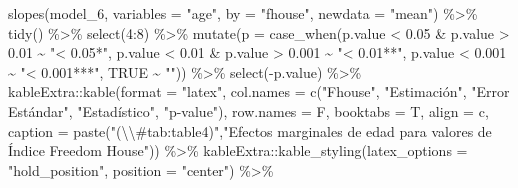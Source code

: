 \documentclass[
  12pt,
  a4paper,
]{article}
\newenvironment{Shaded}{\begin{snugshade}}{\end{snugshade}}
\newcommand{\AttributeTok}[1]{\textcolor[rgb]{0.77,0.63,0.00}{#1}}
\newcommand{\ConstantTok}[1]{\textcolor[rgb]{0.00,0.00,0.00}{#1}}
\newcommand{\DecValTok}[1]{\textcolor[rgb]{0.00,0.00,0.81}{#1}}
\newcommand{\FloatTok}[1]{\textcolor[rgb]{0.00,0.00,0.81}{#1}}
\newcommand{\FunctionTok}[1]{\textcolor[rgb]{0.00,0.00,0.00}{#1}}
\newcommand{\NormalTok}[1]{#1}
\newcommand{\SpecialCharTok}[1]{\textcolor[rgb]{0.00,0.00,0.00}{#1}}
\newcommand{\StringTok}[1]{\textcolor[rgb]{0.31,0.60,0.02}{#1}}
\begin{document}
\begin{Shaded}
\begin{Highlighting}[]
\FunctionTok{slopes}\NormalTok{(model\_6, }\AttributeTok{variables =} \StringTok{"age"}\NormalTok{, }\AttributeTok{by =} \StringTok{"fhouse"}\NormalTok{, }\AttributeTok{newdata =} \StringTok{"mean"}\NormalTok{) }\SpecialCharTok{\%\textgreater{}\%} 
  \FunctionTok{tidy}\NormalTok{() }\SpecialCharTok{\%\textgreater{}\%} 
  \FunctionTok{select}\NormalTok{(}\DecValTok{4}\SpecialCharTok{:}\DecValTok{8}\NormalTok{) }\SpecialCharTok{\%\textgreater{}\%} 
  \FunctionTok{mutate}\NormalTok{(}\AttributeTok{p =} \FunctionTok{case\_when}\NormalTok{(p.value }\SpecialCharTok{\textless{}} \FloatTok{0.05} \SpecialCharTok{\&}\NormalTok{ p.value }\SpecialCharTok{\textgreater{}} \FloatTok{0.01} \SpecialCharTok{\textasciitilde{}} \StringTok{"\textless{} 0.05*"}\NormalTok{,}
\NormalTok{                       p.value }\SpecialCharTok{\textless{}} \FloatTok{0.01} \SpecialCharTok{\&}\NormalTok{ p.value }\SpecialCharTok{\textgreater{}} \FloatTok{0.001} \SpecialCharTok{\textasciitilde{}} \StringTok{"\textless{} 0.01**"}\NormalTok{,}
\NormalTok{                       p.value }\SpecialCharTok{\textless{}} \FloatTok{0.001} \SpecialCharTok{\textasciitilde{}} \StringTok{"\textless{} 0.001***"}\NormalTok{,}
                       \ConstantTok{TRUE} \SpecialCharTok{\textasciitilde{}} \StringTok{""}\NormalTok{)) }\SpecialCharTok{\%\textgreater{}\%} 
  \FunctionTok{select}\NormalTok{(}\SpecialCharTok{{-}}\NormalTok{p.value) }\SpecialCharTok{\%\textgreater{}\%} 
\NormalTok{  kableExtra}\SpecialCharTok{::}\FunctionTok{kable}\NormalTok{(}\AttributeTok{format =} \StringTok{"latex"}\NormalTok{, }
                    \AttributeTok{col.names =} \FunctionTok{c}\NormalTok{(}\StringTok{"Fhouse"}\NormalTok{, }\StringTok{"Estimación"}\NormalTok{, }\StringTok{"Error Estándar"}\NormalTok{, }\StringTok{"Estadístico"}\NormalTok{, }\StringTok{"p{-}value"}\NormalTok{),}
                    \AttributeTok{row.names =}\NormalTok{ F,}
                    \AttributeTok{booktabs =}\NormalTok{ T, }\AttributeTok{align =} \StringTok{\textquotesingle{}c\textquotesingle{}}\NormalTok{,}
                    \AttributeTok{caption =} \FunctionTok{paste}\NormalTok{(}\StringTok{"(}\SpecialCharTok{\textbackslash{}\textbackslash{}}\StringTok{\#tab:table4)"}\NormalTok{,}\StringTok{"Efectos marginales de edad para valores de Índice Freedom House"}\NormalTok{)) }\SpecialCharTok{\%\textgreater{}\%} 
\NormalTok{  kableExtra}\SpecialCharTok{::}\FunctionTok{kable\_styling}\NormalTok{(}\AttributeTok{latex\_options =} \StringTok{"hold\_position"}\NormalTok{, }
                            \AttributeTok{position =} \StringTok{"center"}\NormalTok{) }\SpecialCharTok{\%\textgreater{}\%}

\end{Highlighting}
\end{Shaded}
\end{document}
